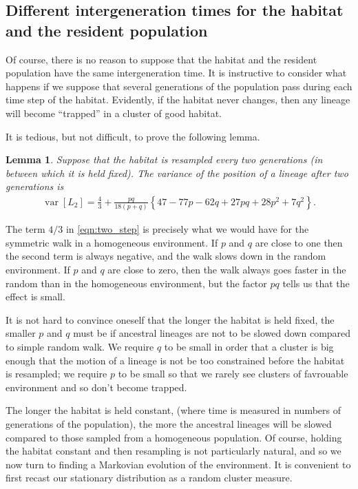 \documentclass{article}
\DeclareMathOperator{\var}{var}
\newtheorem{lemma}{Lemma}
\begin{document}
\subsection{Different intergeneration times for the habitat and the resident population}

Of course, 
there is no reason to suppose that the habitat and the resident population 
have the same intergeneration time. 
It is instructive to consider what happens if we suppose that several generations of the population
pass during each time step of the habitat.
Evidently, if the habitat never changes, 
then any lineage will become ``trapped'' in a cluster of good habitat.

It is tedious, but not difficult, to prove the following lemma.
\begin{lemma}
    Suppose that the habitat is resampled every two generations 
    (in between which it is held fixed). 
    The variance of the position of a lineage after two generations is
    \begin{align} \label{eqn:two_step}
        \var[L_2] 
            = \frac{4}{3} + 
            \frac{pq}{18(p+q)} \left\{
                47 - 77p - 62q + 27pq + 28p^2 + 7q^2
            \right\} .
    \end{align}
\end{lemma}

The term $4/3$ in \eqref{eqn:two_step} 
is precisely what we would have for the symmetric walk in a homogeneous environment. 
If $p$ and $q$ are close to one then the second term is always negative, 
and the walk slows down in the random environment.
If $p$ and $q$ are close to zero, 
then the walk always goes faster in the random than in the homogeneous environment, 
but the factor $pq$ tells us that the effect is small.

It is not hard to convince oneself that the longer the habitat is held fixed, 
the smaller $p$ and $q$ must be 
if ancestral lineages are not to be slowed down compared to simple random walk. 
We require $q$ to be small in order that a cluster is big enough 
that the motion of a lineage is not be too constrained before the habitat is resampled;
we require $p$ to be small so that we rarely see clusters of favrouable environment 
and so don’t become trapped.

The longer the habitat is held constant, 
(where time is measured in numbers of generations of the population), 
the more the ancestral lineages will be slowed compared to those sampled from a homogeneous population. 
Of course, holding the habitat constant and then resampling is not particularly natural, 
and so we now turn to finding a Markovian evolution of the environment. 
It is convenient to first recast our stationary distribution as a random cluster measure.
\end{document}
